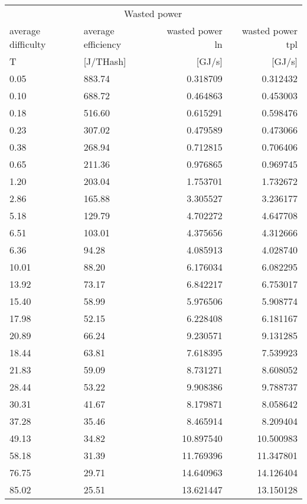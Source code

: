 \begin{tabular}{@{}llrr@{}}
\toprule
 & \multicolumn{2}{c}{Wasted power} \\
\cmidrule(lr){3-4} 
average difficulty & average efficiency & wasted power ln & wasted power tpl\\
T & [J/THash] & [GJ/s] & [GJ/s]\\
\cmidrule(lr){1-4}
0.05 & 883.74 & 0.318709 & 0.312432 \\
0.10 & 688.72 & 0.464863 & 0.453003 \\
0.18 & 516.60 & 0.615291 & 0.598476 \\
0.23 & 307.02 & 0.479589 & 0.473066 \\
0.38 & 268.94 & 0.712815 & 0.706406 \\
0.65 & 211.36 & 0.976865 & 0.969745 \\
1.20 & 203.04 & 1.753701 & 1.732672 \\
2.86 & 165.88 & 3.305527 & 3.236177 \\
5.18 & 129.79 & 4.702272 & 4.647708 \\
6.51 & 103.01 & 4.375656 & 4.312666 \\
6.36 & 94.28 & 4.085913 & 4.028740 \\
10.01 & 88.20 & 6.176034 & 6.082295 \\
13.92 & 73.17 & 6.842217 & 6.753017 \\
15.40 & 58.99 & 5.976506 & 5.908774 \\
17.98 & 52.15 & 6.228408 & 6.181167 \\
20.89 & 66.24 & 9.230571 & 9.131285 \\
18.44 & 63.81 & 7.618395 & 7.539923 \\
21.83 & 59.09 & 8.731271 & 8.608052 \\
28.44 & 53.22 & 9.908386 & 9.788737 \\
30.31 & 41.67 & 8.179871 & 8.058642 \\
37.28 & 35.46 & 8.465914 & 8.209404 \\
49.13 & 34.82 & 10.897540 & 10.500983 \\
58.18 & 31.39 & 11.769396 & 11.347801 \\
76.75 & 29.71 & 14.640963 & 14.126404 \\
85.02 & 25.51 & 13.621447 & 13.150128 \\
\bottomrule
\end{tabular}
